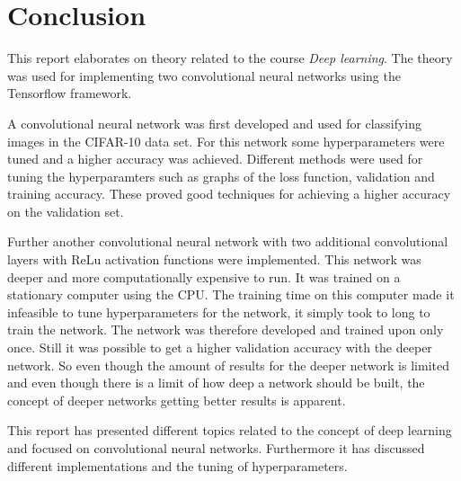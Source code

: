 \chapter{Conclusion}
\label{chp:conc}

This report elaborates on theory related to the course \emph{Deep learning}. The theory was used for implementing two convolutional neural networks using the Tensorflow framework.

A  convolutional neural network was first developed and used for classifying images in the CIFAR-10 data set. For this network some hyperparameters were tuned and a higher accuracy was achieved. Different methods were used for tuning the hyperparamters such as graphs of the loss function, validation and training accuracy. These proved good techniques for achieving a higher accuracy on the validation set.

Further another convolutional neural network with two additional convolutional layers with ReLu activation functions were implemented. This network was deeper and more computationally expensive to run. It was trained on a stationary computer using the CPU. The training time on this computer made it infeasible to tune hyperparameters for the network, it simply took to long to train the network. The network was therefore developed and trained upon only once. Still it was possible to get a higher validation accuracy with the deeper network. So even though the amount of results for the deeper network is limited and even though there is a limit of how deep a network should be built, the concept of deeper networks getting better results is apparent. 

This report has presented different topics related to the concept of deep learning and focused on convolutional neural networks. Furthermore it has discussed different implementations and the tuning of hyperparameters. 